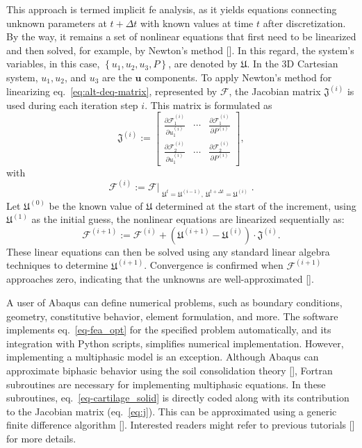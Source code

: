 \documentclass[12pt,a4paper]{report}
\begin{document}
This approach is termed implicit \ac{fe} analysis, as it yields equations connecting unknown parameters at $t + \Delta t$ with known values at time $t$ after discretization. By the way, it remains a set of nonlinear equations that first need to be linearized and then solved, for example, by Newton's method [\cite{almeida1997,belytschko2014}]. In this regard, the system's variables, in this case, $\left\{ u_1, u_2, u_3, P \right\}$, are denoted by $\mathfrak{U}$. In the 3D Cartesian system, $u_1, u_2$, and $u_3$ are the $\mathbf{u}$ components. To apply Newton's method for linearizing eq.~\ref{eq:alt-deq-matrix}, represented by $\mathcal{F}$, the Jacobian matrix $\mathfrak{J}^{(i)}$ is used during each iteration step $i$. This matrix is formulated as
%
\begin{equation}
    \label{eq:j}
    \mathfrak{J}^{(i)} := \begin{bmatrix}
        \frac{\partial \mathcal{F}^{(i)}_1}{\partial u^{(i)}_1} & \cdots & \frac{\partial \mathcal{F}^{(i)}_1}{\partial P^{(i)}}\\
        \frac{\partial \mathcal{F}^{(i)}_2}{\partial u^{(i)}_1} & \cdots & \frac{\partial \mathcal{F}^{(i)}_2}{\partial P^{(i)}}
    \end{bmatrix},
\end{equation}
%
with
%
\begin{equation}
    \mathcal{F}^{(i)} := \mathcal{F}\Big|_{\substack{\mathfrak{U}^t=\mathfrak{U}^{(i-1)}, \: \mathfrak{U}^{t+\Delta t}=\mathfrak{U}^{(i)}}}.
\end{equation}
%
Let $\mathfrak{U}^{(0)}$ be the known value of $\mathfrak{U}$ determined at the start of the increment, using $\mathfrak{U}^{(1)}$ as the initial guess, the nonlinear equations are linearized sequentially as:
%
\begin{equation}\label{eq-fea_opt}
    \mathcal{F}^{(i+1)} := \mathcal{F}^{(i)} + \left ( \mathfrak{U}^{(i+1)} - \mathfrak{U}^{(i)} \right ) \cdot \mathfrak{J}^{(i)}.
\end{equation}
%
These linear equations can then be solved using any standard linear algebra techniques to determine $\mathfrak{U}^{(i+1)}$. Convergence is confirmed when $\mathcal{F}^{(i+1)}$ approaches zero, indicating that the unknowns are well-approximated [\cite{belytschko2014}].

A user of Abaqus can define numerical problems, such as boundary conditions, geometry, constitutive behavior, element formulation, and more. The software implements eq.~\ref{eq-fea_opt} for the specified problem automatically, and its integration with Python scripts, simplifies numerical implementation. However, implementing a multiphasic model is an exception. Although Abaqus can approximate biphasic behavior using the soil consolidation theory [\cite{verruijt1984}], Fortran subroutines are necessary for implementing multiphasic equations. In these subroutines, eq.~\ref{eq-cartilage_solid} is directly coded along with its contribution to the Jacobian matrix (eq.~\ref{eq:j}). This can be approximated using a generic finite difference algorithm [\cite{miehe1996}]. Interested readers might refer to previous tutorials [\cite{nolan2022,fehervary2020}] for more details.
\end{document}
